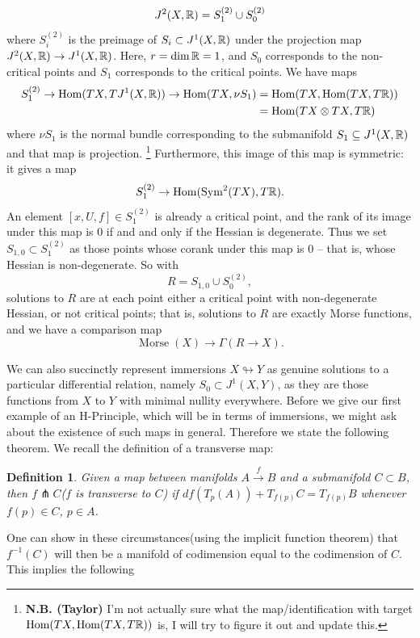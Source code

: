 \documentclass{article}
\newtheorem{definition}[theorem]{Definition}
\newtheorem{proposed work}[theorem]{Proposed Work}
\DeclareMathOperator{\Hom}{Hom}
\begin{document}
\[
  J^2(X,\mathbb R) = S_1^{(2)} \cup S_0^{(2)}
\]
where $S_i^{(2)}$ is the preimage of $S_i\subset J^1(X, \mathbb R)$ under the projection map $J^2(X, \mathbb R)\to J^1(X, \mathbb R)$. Here, $r= \dim\mathbb R = 1$, and $S_0$ corresponds to the non-critical points and $S_1$ corresponds to the critical points. We have maps
\begin{align*}
  S^{(2)}_1\to \Hom(TX, TJ^1(X, \R))\to \Hom(TX, \nu S_1) &= \Hom(TX,\Hom(TX,T\R))\\
                                                          &= \Hom(TX\otimes TX, T\R)
\end{align*}
where $\nu S_1$ is the normal bundle corresponding to the submanifold $S_1\subseteq J^1(X,\mathbb R)$ and that map is projection.
\footnote{\textbf{N.B. (Taylor)} I'm not actually sure what the map/identification with target $\Hom(TX, \Hom(TX,T\R))$ is, I will try to figure it out and update this.}
Furthermore, this image of this map is symmetric: it gives a map
\[
  S^{(2)}_1\to\Hom(\operatorname{Sym}^2(TX), T\R).
\]
An element $[x, U, f]\in S^{(2)}_1$ is already a critical point, and the rank of its image under this map is 0 if and and only if the Hessian is degenerate. Thus we set $S_{1,0}\subset S^{(2)}_1$ as those points whose corank under this map is $0$ -- that is, whose Hessian is non-degenerate. So with
\[
R = S_{1,0}\cup S_0^{(2)},
\]
solutions to $R$ are at each point either a critical point with non-degenerate Hessian, or not critical points; that is, solutions to $R$ are exactly Morse functions, and we have a comparison map
\[
  \operatorname{Morse}(X)\to \Gamma(R\to X).
\]


We can also succinctly represent immersions $X \looparrowright Y$ as genuine solutions to a particular differential relation, namely $S_0 \subset J^1(X,Y)$, as they are those functions from $X$ to $Y$ with minimal nullity everywhere. 
Before we give our first example of an H-Principle, which will be in terms of immersions, we might ask about the existence of such maps in general. Therefore we state the following theorem.  We recall the definition of a transverse map:

\begin{definition}\label{thm: transverse}
Given a map between manifolds $A \xrightarrow{f} B$ and a submanifold $C \subset B$, then $f \pitchfork C$($f$ is transverse to $C$) if $df(T_p(A))+T_{f(p)}C=T_{f(p)}B$ whenever $f(p) \in C$, $ p \in A$.
\end{definition}

One can show in these circumstances(using the implicit function theorem) that $f^{-1}(C)$ will then be a manifold of codimension equal to the codimension of $C$.  This implies the following
\end{document}
